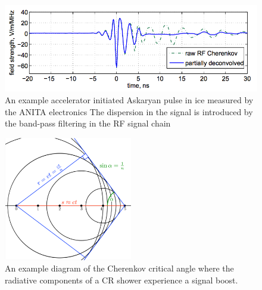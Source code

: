 \begin{figure}
\centering
	\includegraphics[width=\textwidth]{figures/ANITASLACImpulse}
	\caption{An example accelerator initiated Askaryan pulse in ice measured by the ANITA electronics  The dispersion in the signal is introduced by the band-pass filtering in the RF signal chain\cite{PhysRevLett.99.171101} }
	\label{fig:ANITASLACPulse}
\end{figure}


\begin{figure}
\centering
	\includegraphics[width=0.5\textwidth]{figures/Cherenkov}
	\caption{An example diagram of the Cherenkov critical angle where the radiative components of a CR shower experience a signal boost.}
	\label{fig:Cherenkov}
\end{figure}


		



